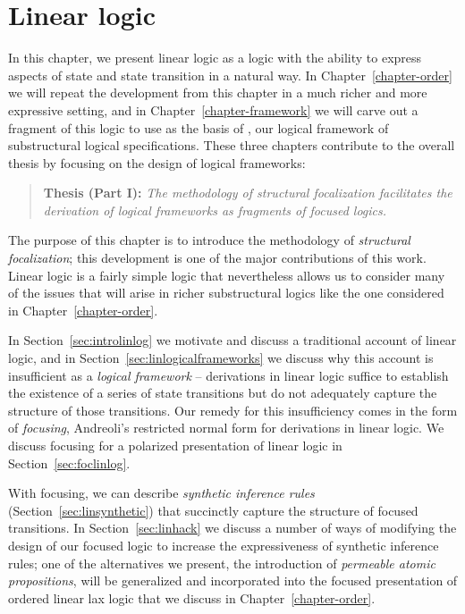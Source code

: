 \chapter{Linear logic}
\label{chapter-foc}

In this chapter, we present linear logic as a logic with the ability
to express aspects of state and state transition in a natural way.  In
Chapter~\ref{chapter-order} 
we will repeat the development from this chapter in a much
richer and more expressive setting, and in Chapter~\ref{chapter-framework} 
we will carve out
a fragment of this logic to use as the basis of \sls, our logical
framework of substructural logical specifications. These three
chapters contribute to the overall thesis by focusing on the design
of logical frameworks:

\smallskip
\begin{quote} {\bf Thesis (Part I):} {\it The methodology of
    structural focalization facilitates the derivation of logical
    frameworks as fragments of focused logics.}
\end{quote}
\smallskip

\noindent
The purpose of this chapter is to introduce the methodology of
{\it structural focalization};
this development is one of the major contributions of this work. 
Linear logic is a fairly simple logic that nevertheless allows us to
consider many of the issues that will arise in richer substructural
logics like the one considered in Chapter~\ref{chapter-order}.

In Section~\ref{sec:introlinlog} we motivate and discuss a traditional
account of linear logic, and in
Section~\ref{sec:linlogicalframeworks} we discuss why this account is
insufficient as a {\it logical framework} -- derivations in linear
logic suffice to establish the existence of a series of state
transitions but do not adequately capture the structure of those
transitions. Our remedy for this insufficiency comes in the form of
{\it focusing}, Andreoli's restricted normal form for derivations in
linear logic. We discuss focusing for a polarized presentation of
linear logic in Section~\ref{sec:foclinlog}.

With focusing, we can describe {\it synthetic inference rules}
(Section~\ref{sec:linsynthetic}) that succinctly capture the structure
of focused transitions. In Section~\ref{sec:linhack} we discuss a
number of ways of modifying the design of our focused logic to
increase the expressiveness of synthetic inference rules; one of the
alternatives we present, the introduction of {\it permeable atomic
  propositions}, will be generalized and incorporated into the focused
presentation of ordered linear lax logic that we discuss in 
Chapter~\ref{chapter-order}.

